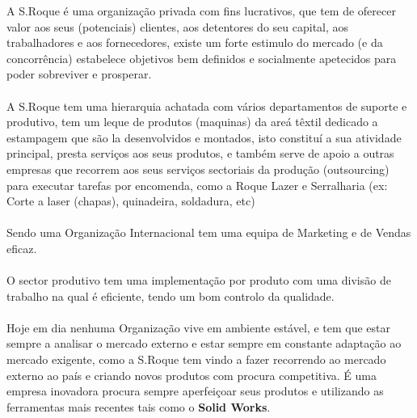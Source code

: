 \qquad A S.Roque é uma organização privada com fins lucrativos, que tem de oferecer valor aos seus (potenciais) clientes, aos detentores do seu capital, aos trabalhadores e aos fornecedores, existe um forte estimulo do mercado (e da concorrência) estabelece objetivos bem definidos e socialmente apetecidos para poder sobreviver e prosperar.\\
\\
A S.Roque tem uma hierarquia achatada com vários departamentos de suporte e produtivo, tem um leque de produtos (maquinas) da areá têxtil dedicado a estampagem que são la desenvolvidos e montados, isto constituí a sua atividade principal, presta serviços aos seus produtos, e também serve de apoio a outras empresas que recorrem aos seus serviços sectoriais da produção (outsourcing) para executar tarefas por encomenda, como a Roque Lazer e Serralharia (ex: Corte a laser (chapas), quinadeira, soldadura, etc)\\
\\
Sendo uma Organização Internacional tem uma equipa de Marketing e de Vendas eficaz.\\
\\
O sector produtivo tem uma implementação por produto com uma divisão de trabalho na qual é eficiente, tendo um bom controlo da qualidade.\\
\\
Hoje em dia nenhuma Organização vive em ambiente estável, e tem que estar sempre a analisar o mercado externo e estar sempre em constante adaptação ao mercado exigente, como a S.Roque tem vindo a fazer recorrendo ao mercado externo ao país e criando novos produtos com procura competitiva. É uma empresa inovadora procura sempre aperfeiçoar seus produtos e utilizando as ferramentas mais recentes tais como o \textbf{Solid Works}.\\











\newpage
